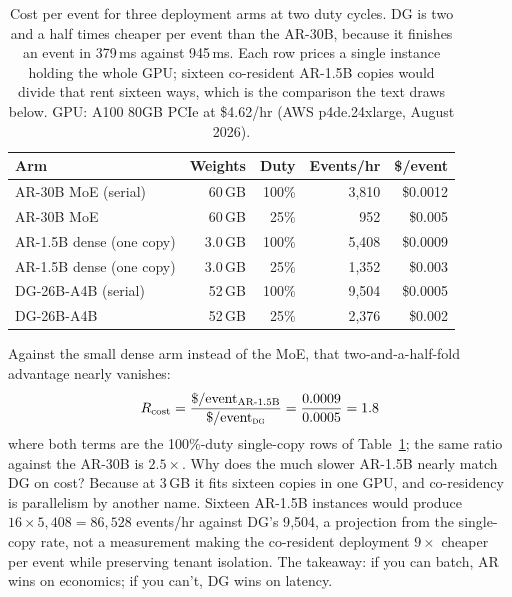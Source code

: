 \begin{table}[h]
\centering
\caption{Cost per event for three deployment arms at two duty cycles.
DG is two and a half times cheaper per event than the AR-30B, because it
finishes an event in 379\,ms against 945\,ms. Each row prices a
single instance holding the whole GPU; sixteen co-resident AR-1.5B
copies would divide that rent sixteen ways, which is the comparison
the text draws below. GPU: A100 80GB PCIe at \$4.62/hr (AWS
p4de.24xlarge, August 2026).}
\label{tab:cost}
\begin{tabular}{@{}lrrrr@{}}
\toprule
Arm & Weights & Duty & Events/hr & \$/event \\
\midrule
AR-30B MoE (serial) & 60\,GB & 100\% & 3{,}810 & \$0.0012 \\
AR-30B MoE           & 60\,GB & 25\%  & 952 & \$0.005 \\
\midrule
AR-1.5B dense (one copy)    & 3.0\,GB & 100\% & 5{,}408 & \$0.0009 \\
AR-1.5B dense (one copy)     & 3.0\,GB & 25\%  & 1{,}352 & \$0.003 \\
\midrule
DG-26B-A4B (serial)  & 52\,GB & 100\% & 9{,}504 & \$0.0005 \\
DG-26B-A4B            & 52\,GB & 25\%  & 2{,}376 & \$0.002 \\
\bottomrule
\end{tabular}
\end{table}

Against the small dense arm instead of the MoE, that two-and-a-half-fold
advantage nearly vanishes:
\begin{equation}
R_{\mathrm{cost}} = \frac{\$ / \mathrm{event}_{\text{AR-1.5B}}}
{\$ / \mathrm{event}_{\textsc{dg}}}
= \frac{0.0009}{0.0005} = 1.8
\end{equation}
where both terms are the 100\%-duty single-copy rows of
Table~\ref{tab:cost}; the same ratio against the AR-30B is
$2.5\times$. Why does the much slower AR-1.5B nearly match DG on
cost? Because at 3\,GB it fits sixteen copies in one GPU, and
co-residency is parallelism by another name. Sixteen AR-1.5B instances
would produce $16 \times 5{,}408 = 86{,}528$ events/hr against DG's
9{,}504, a projection from the single-copy rate, not a measurement
making the co-resident deployment $9\times$ cheaper per event while
preserving tenant isolation. The takeaway: if you can batch, AR
wins on economics; if you can't, DG wins on latency.

